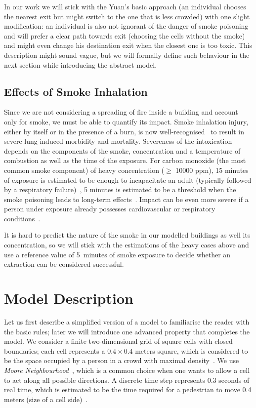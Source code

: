 In our work we will stick with the Yuan's basic approach (an individual chooses
the nearest exit but might switch to the one that is less crowded) with one
slight modification: an individual is also not ignorant of the danger
of smoke poisoning and will prefer a clear path towards exit (choosing the
cells without the smoke) and might even change his destination exit when the
closest one is too toxic.
This description might sound vague, but we will formally define such behaviour
in the next section while introducing the abstract model.

\subsection{Effects of Smoke Inhalation}
Since we are not considering a spreading of fire inside a building and account
only for smoke, we must be able to quantify its impact.
Smoke inhalation injury, either by itself or in the presence of a burn, is now
well-recognised~\cite{NCBI} to result in severe lung-induced morbidity and
mortality.
Severeness of the intoxication depends on the components of the smoke,
concentration and a temperature of combustion as well as the time of the
exposure.
For carbon monoxide (the most common smoke component) of heavy concentration
($\geq$ 10000 ppm), 15 minutes of exposure is estimated to be enough to
incapacitate an adult (typically followed by a respiratory
failure)~\cite{CO1, CO3}, 5 minutes is estimated to be a threshold when
the smoke poisoning leads to long-term effects~\cite{NCBI, CO2, CO3}.
Impact can be even more severe if a person under exposure already possesses
cardiovascular or respiratory conditions~\cite{NCBI, Inhalation}.

It is hard to predict the nature of the smoke in our modelled buildings as well
its concentration, so we will stick with the estimations of the heavy cases
above and use a reference value of 5~minutes of smoke exposure to decide
whether an extraction can be considered successful.

\section{Model Description}
Let us first describe a simplified version of a model to familiarise the reader
with the basic rules; later we will introduce one advanced property that
completes the model.
We consider a finite two-dimensional grid of square cells with closed
boundaries; each cell represents a $0.4 \times 0.4$ meters square, which is
considered to be the space occupied by a person in a crowd with maximal
density~\cite{Density1, Density2}.
We use \emph{Moore Neighbourhood}~\cite{Moore}, which is a common choice when
one wants to allow a cell to act along all possible directions.
A discrete time step represents 0.3 seconds of real time, which is estimated to
be the time required for a pedestrian to move 0.4 meters (size of a cell
side)~\cite{Density1}.

